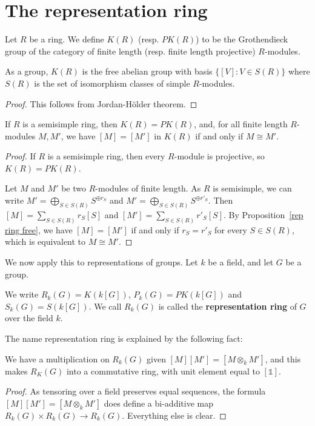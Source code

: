 \section{The representation ring}
\begin{definition}
Let $R$ be a ring. We define $K(R)$ (resp. $PK(R)$) to be the Grothendieck group of the category of finite length (resp. finite length projective) $R$-modules.
\end{definition}
\begin{proposition}\label{rep ring free}
As a group, $K(R)$ is the free abelian group with basis $\{[V]:V\in S(R)\}$ where $S(R)$ is the set of isomorphism classes of simple $R$-modules.
\end{proposition}
\begin{proof}
This follows from Jordan-H\"older theorem.
\end{proof}
\begin{proposition}
If $R$ is a semisimple ring, then $K(R)=PK(R)$, and, for all finite length $R$-modules $M,M'$, we have $[M]=[M']$ in $K(R)$ if and only if $M\cong M'$.
\end{proposition}
\begin{proof}
If $R$ is a semisimple ring, then every $R$-module is projective, so $K(R)=PK(R)$.\par
Let $M$ and $M'$ be two $R$-modules of finite length. As $R$ is semisimple, we can write $M'=\bigoplus_{S\in S(R)}S^{\oplus r_S}$ and $M'=\bigoplus_{S\in S(R)}S^{\oplus r'_S}$. Then $[M]=\sum_{S\in S(R)}r_S[S]$ and $[M']=\sum_{S\in S(R)}r'_S[S]$. By Proposition~\ref{rep ring free}, we have $[M]=[M']$ if and only if $r_S=r'_S$ for every $S\in S(R)$, which is equivalent to $M\cong M'$.
\end{proof}
We now apply this to representations of groups. Let $k$ be a field, and let $G$ be a group.
\begin{definition}
We write $R_k(G)=K(k[G])$, $P_k(G)=PK(k[G])$ and $S_k(G)=S(k[G])$. We call $R_k(G)$ is called the \textbf{representation ring} of $G$ over the field $k$.
\end{definition}
The name representation ring is explained by the following fact:
\begin{proposition}
We have a multiplication on $R_k(G)$ given $[M][M']=[M\otimes_kM']$, and this makes $R_K(G)$ into a commutative ring, with unit element equal to $[\mathds{1}]$.
\end{proposition}
\begin{proof}
As tensoring over a field preserves equal sequences, the formula $[M][M']=[M\otimes_kM']$ does define a bi-additive map $R_k(G)\times R_k(G)\to R_k(G)$. Everything else is clear.
\end{proof}
